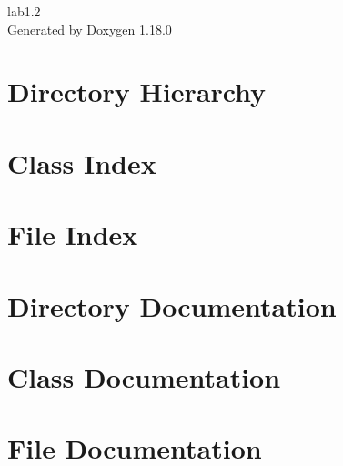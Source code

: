 \documentclass[twoside]{book}
\newcommand{\+}{\discretionary{\mbox{\scriptsize$\hookleftarrow$}}{}{}}
\newcommand{\clearemptydoublepage}{%
    \newpage{\pagestyle{empty}\cleardoublepage}%
  }
\begin{document}
  \raggedbottom
    \hypersetup{pageanchor=false,
                bookmarksnumbered=true,
                pdfencoding=unicode
               }
  \begin{titlepage}
  \vspace*{7cm}
  \begin{center}%
  {\Large lab1.\+2}\\
  \vspace*{1cm}
  {\large Generated by Doxygen 1.18.0}\\
  \end{center}
  \end{titlepage}
  \clearemptydoublepage
  \tableofcontents
  \clearemptydoublepage
  \hypersetup{pageanchor=true}
\chapter{Directory Hierarchy}

\chapter{Class Index}

\chapter{File Index}

\chapter{Directory Documentation}


\chapter{Class Documentation}






\chapter{File Documentation}


















  \backmatter
  \newpage
  \clearemptydoublepage
  \printindex
\end{document}

